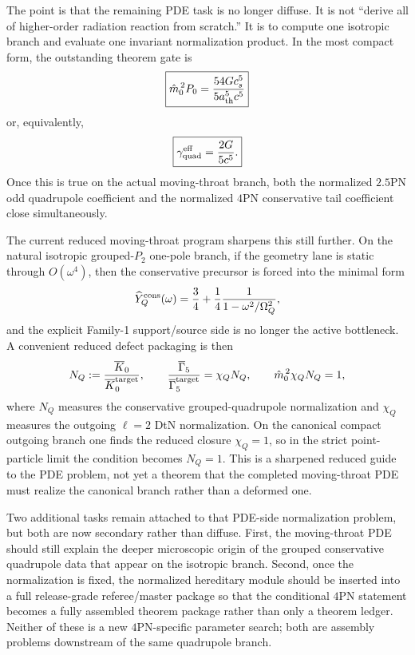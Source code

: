 \documentclass[11pt]{article}
\begin{document}
The point is that the remaining PDE task is no longer diffuse.  It is not
``derive all of higher-order radiation reaction from scratch.''  It is to compute
one isotropic branch and evaluate one invariant normalization product.  In the
most compact form, the outstanding theorem gate is
\begin{equation}
\boxed{
\hat m_0^{\,2}P_0
=
\frac{54Gc_s^5}{5a_{\rm th}^5c^5}
}
\label{eq:interface-normalization-target}
\end{equation}
or, equivalently,
\begin{equation}
\boxed{
\gamma_{\rm quad}^{\rm eff}=\frac{2G}{5c^5}.
}
\label{eq:interface-gamma-target}
\end{equation}
Once this is true on the actual moving-throat branch, both the normalized
$2.5$PN odd quadrupole coefficient and the normalized $4$PN conservative tail
coefficient close simultaneously.

The current reduced moving-throat program sharpens this still further.  On the
natural isotropic grouped-$P_2$ one-pole branch, if the geometry lane is static
through $O(\omega^4)$, then the conservative precursor is forced into the
minimal form
\begin{equation}
\widehat Y_Q^{\rm cons}(\omega)
=
\frac34+\frac14\frac{1}{1-\omega^2/\Omega_Q^2},
\label{eq:interface-minimal-conservative-module}
\end{equation}
and the explicit Family-1 support/source side is no longer the active bottleneck.
A convenient reduced defect packaging is then
\begin{equation}
N_Q:=\frac{\overline K_0}{\overline K_0^{\rm target}},
\qquad
\frac{\overline\Gamma_5}{\overline\Gamma_5^{\rm target}}=\chi_Q N_Q,
\qquad
\hat m_0^{\,2}\chi_Q N_Q=1,
\label{eq:interface-NQ-chiQ}
\end{equation}
where $N_Q$ measures the conservative grouped-quadrupole normalization and
$\chi_Q$ measures the outgoing $\ell=2$ DtN normalization.  On the canonical
compact outgoing branch one finds the reduced closure $\chi_Q=1$, so in the
strict point-particle limit the condition becomes $N_Q=1$.  This is a sharpened
reduced guide to the PDE problem, not yet a theorem that the completed
moving-throat PDE must realize the canonical branch rather than a deformed one.

Two additional tasks remain attached to that PDE-side normalization problem, but
both are now secondary rather than diffuse.  First, the moving-throat PDE should
still explain the deeper microscopic origin of the grouped conservative
quadrupole data that appear on the isotropic branch.  Second, once the
normalization is fixed, the normalized hereditary module should be inserted into
a full release-grade referee/master package so that the conditional $4$PN
statement becomes a fully assembled theorem package rather than only a theorem
ledger.  Neither of these is a new $4$PN-specific parameter search; both are
assembly problems downstream of the same quadrupole branch.
\end{document}
